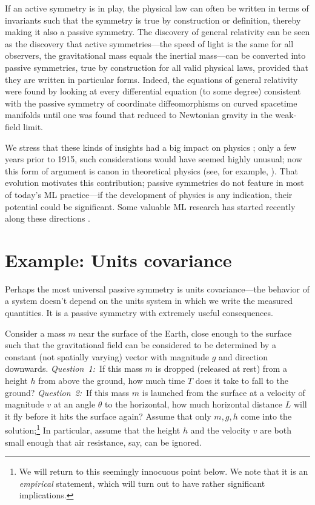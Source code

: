 \documentclass[]{article} %
\begin{document}
If an active symmetry is in play, the physical law can often be written in terms of invariants such that the symmetry is true by construction or definition, thereby making it also a passive symmetry.
The discovery of general relativity \citep{gr} can be seen as the discovery that active symmetries---the speed of light is the same for all observers, the gravitational mass equals the inertial mass---can be converted into passive symmetries, true by construction for all valid physical laws, provided that they are written in particular forms.
Indeed, the equations of general relativity were found by looking at every differential equation (to some degree) consistent with the passive symmetry of coordinate diffeomorphisms on curved spacetime manifolds until one was found that reduced to Newtonian gravity in the weak-field limit.

We stress that these kinds of insights had a big impact on physics \citep{EARMAN1978251};
only a few years prior to 1915, such considerations would have seemed highly unusual;
now this form of argument is canon in theoretical physics (see, for example, \citealt{zee2016group}).
That evolution motivates this contribution; passive symmetries do not feature in most of today's ML practice---if the development of physics is any indication, their potential could be significant.
Some valuable ML research has started recently along these directions \citep{weiler, bronstein2021geometric}.

\section{Example: Units covariance}\label{sec:units}
Perhaps the most universal passive symmetry is units covariance---the behavior of a system doesn't depend on the units system in which we write the measured quantities.
It is a passive symmetry with extremely useful consequences.

Consider a mass $m$ near the surface of the Earth, close enough to the surface such that the gravitational field can be considered to be determined by a constant (not spatially varying) vector with magnitude $g$ and direction downwards.
\textsl{Question~1:}~If this mass $m$ is dropped (released at rest) from a height $h$ from above the ground, how much time $T$ does it take to fall to the ground?
\textsl{Question~2:}~If this mass $m$ is launched from the surface at a velocity of magnitude $v$ at an angle $\theta$ to the horizontal, how much horizontal distance $L$ will it fly before it hits the surface again?
Assume that only $m, g, h$ come into the solution;\footnote{We will return to this seemingly innocuous point below. We note that it is an \emph{empirical} statement, which will turn out to have rather significant implications.} In particular, assume that the height $h$ and the velocity $v$ are both small enough that air resistance, say, can be ignored.
\end{document}
